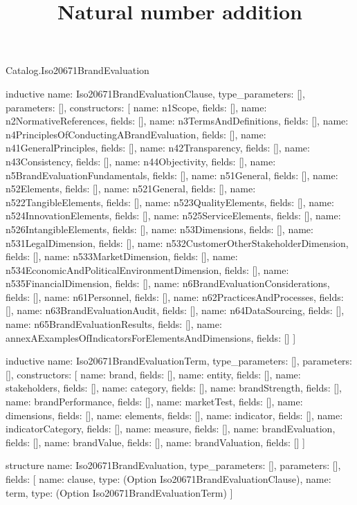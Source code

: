 \begin{lexlean}{Catalog.Iso20671BrandEvaluation}
\title{Natural number addition}
\begin{semanticmodule}
inductive{
  name: Iso20671BrandEvaluationClause,
  type_parameters: [],
  parameters: [],
  constructors: [
    {name: n1Scope, fields: []},
    {name: n2NormativeReferences, fields: []},
    {name: n3TermsAndDefinitions, fields: []},
    {name: n4PrinciplesOfConductingABrandEvaluation, fields: []},
    {name: n41GeneralPrinciples, fields: []},
    {name: n42Transparency, fields: []},
    {name: n43Consistency, fields: []},
    {name: n44Objectivity, fields: []},
    {name: n5BrandEvaluationFundamentals, fields: []},
    {name: n51General, fields: []},
    {name: n52Elements, fields: []},
    {name: n521General, fields: []},
    {name: n522TangibleElements, fields: []},
    {name: n523QualityElements, fields: []},
    {name: n524InnovationElements, fields: []},
    {name: n525ServiceElements, fields: []},
    {name: n526IntangibleElements, fields: []},
    {name: n53Dimensions, fields: []},
    {name: n531LegalDimension, fields: []},
    {name: n532CustomerOtherStakeholderDimension, fields: []},
    {name: n533MarketDimension, fields: []},
    {name: n534EconomicAndPoliticalEnvironmentDimension, fields: []},
    {name: n535FinancialDimension, fields: []},
    {name: n6BrandEvaluationConsiderations, fields: []},
    {name: n61Personnel, fields: []},
    {name: n62PracticesAndProcesses, fields: []},
    {name: n63BrandEvaluationAudit, fields: []},
    {name: n64DataSourcing, fields: []},
    {name: n65BrandEvaluationResults, fields: []},
    {name: annexAExamplesOfIndicatorsForElementsAndDimensions, fields: []}
  ]
}

inductive{
  name: Iso20671BrandEvaluationTerm,
  type_parameters: [],
  parameters: [],
  constructors: [
    {name: brand, fields: []},
    {name: entity, fields: []},
    {name: stakeholders, fields: []},
    {name: category, fields: []},
    {name: brandStrength, fields: []},
    {name: brandPerformance, fields: []},
    {name: marketTest, fields: []},
    {name: dimensions, fields: []},
    {name: elements, fields: []},
    {name: indicator, fields: []},
    {name: indicatorCategory, fields: []},
    {name: measure, fields: []},
    {name: brandEvaluation, fields: []},
    {name: brandValue, fields: []},
    {name: brandValuation, fields: []}
  ]
}

structure{
  name: Iso20671BrandEvaluation,
  type_parameters: [],
  parameters: [],
  fields: [
    {name: clause, type: (Option Iso20671BrandEvaluationClause)},
    {name: term, type: (Option Iso20671BrandEvaluationTerm)}
  ]
}
\end{semanticmodule}
\end{lexlean}
